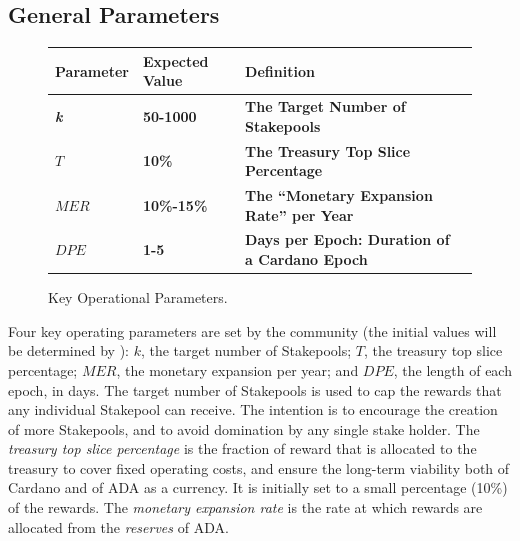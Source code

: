 \documentclass[11pt,a4paper,dvipsnames,twosided,final]{article}
\newcommand{\ada}{ADA{}}
\newcommand{\cardano}[1]{Cardano}
\begin{document}
\subsection{General Parameters}

\begin{figure}[h!]
\begin{center}
\begin{tabular}{||l|l|p{10cm}|l||}
  \hline \hline
\textbf{Parameter} & \textbf{Expected Value} & \textbf{Definition} \\\hline
\textbf{\color{green} \emph{k}} &\textbf{\color{green}  50-1000} & \textbf{\color{green} The Target Number of Stakepools} \\\hline
\textbf{\color{green} $T$ } & \textbf{\color{green}  10\% } & \textbf{\color{green}  The Treasury Top Slice Percentage } \\\hline
\textbf{\color{green} $\textit{MER}$ } & \textbf{\color{green}  10\%-15\% } & \textbf{\color{green}   The ``Monetary Expansion Rate'' per Year } \\\hline
\textbf{\color{green} $\textit{DPE}$ } & \textbf{\color{green}  1-5 } & \textbf{\color{green}   Days per Epoch: Duration of a \cardano{} Epoch } \\\hline
  \hline
\end{tabular}
\end{center}
\caption{Key Operational Parameters.}
\end{figure}

\noindent
Four key operating parameters are set by the community (the initial values will be determined by \IOHK):
$k$, the target number of Stakepools;
$T$, the treasury top slice percentage;
$\textit{MER}$, the monetary expansion per year;
and
$\textit{DPE}$, the length of each epoch, in days.
%
The target number of Stakepools is used to cap the rewards that any individual Stakepool can receive. The intention is to encourage the creation of more Stakepools, and to avoid domination by any single stake holder.
The \emph{treasury top slice percentage} is the fraction of reward that is allocated to the treasury to cover fixed operating costs, and
ensure the long-term viability both of \cardano{} and of \ada{} as a currency.  It is initially set to a small percentage (10\%) of the rewards.
The \emph{monetary expansion rate} is the rate at which rewards are allocated from the \emph{reserves} of \ada{}.
\end{document}
